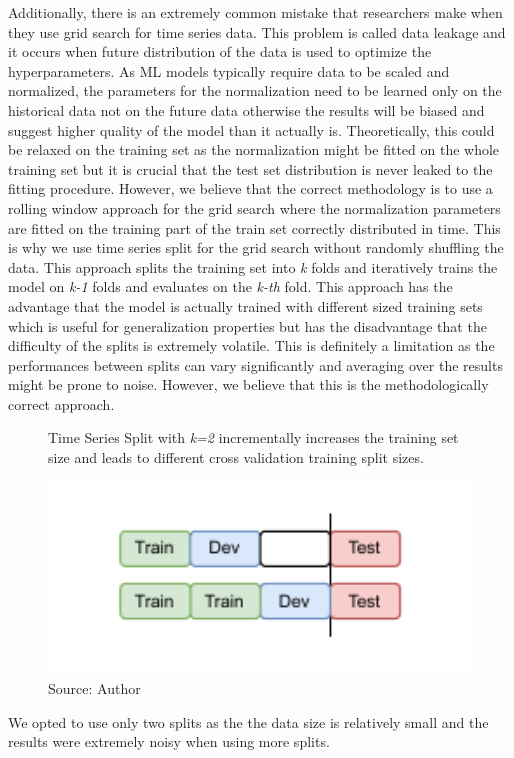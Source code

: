 Additionally, there is an extremely
common mistake that researchers make when they use grid search for time series data.
This problem is called data leakage and it occurs when future distribution of the data
is used to optimize the hyperparameters. As \ac{ML} models typically 
require data to be scaled and normalized, the parameters for the normalization 
need to be learned only on the historical data not on the future data otherwise the 
results will be biased and suggest higher quality of the model than it actually is.
Theoretically, this could be relaxed on the training set as the normalization
might be fitted on the whole training set but it is crucial that the test set distribution
is never leaked to the fitting procedure. However, we believe that
the correct methodology is to use a rolling window approach for the grid search
where the normalization parameters are fitted on the training part of the train set
correctly distributed in time.
This is why we use time series split for the grid search without randomly shuffling the data.
This approach splits the training set into \textit{k} folds and iteratively
trains the model on \textit{k-1} folds and evaluates on the \textit{k-th} fold.
This approach has the advantage that the model is actually trained with
different sized training sets which is useful for generalization properties
but has the disadvantage that the difficulty of the splits is extremely volatile.
This is definitely a limitation as the performances between splits
can vary significantly and averaging over the results might be prone to noise.
However, we believe that this is the methodologically correct approach.
\begin{figure}[!h]
    \centering
    \caption{Time Series Split with \textit{k=2} incrementally
    increases the training set size and leads to different cross 
    validation training split sizes.} 
    \includegraphics[width=1\textwidth]{Figures/time_series_split.drawio.pdf}
    \caption*{Source: Author}
    \label{fig:ts_split}
\end{figure}
We opted to use only two splits as the the data size
is relatively small and the results were extremely noisy when using
more splits.


